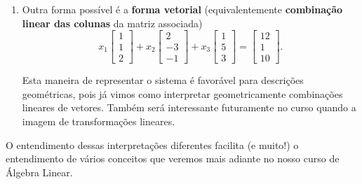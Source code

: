 \documentclass[../livro.tex]{subfiles}  %
\begin{document}
\begin{example}
\begin{enumerate}[$(i)$]
\item Outra forma possível é a \textbf{forma vetorial} (equivalentemente \textbf{combinação linear das colunas} da matriz associada)
\[
x_1
\left[
\begin{array}{c}
1   \\
1  \\
2 
\end{array}
\right] + x_2 
\left[
\begin{array}{c}
  2   \\
 -3   \\
 -1
\end{array}
\right] + x_3 
\left[
\begin{array}{c}
 1  \\
 5  \\
 3
\end{array}
\right] = 
\left[
\begin{array}{c}
12   \\
1  \\
10
\end{array}
\right].
\] 

Esta maneira de representar o sistema é favorável para descrições geométricas, pois já vimos como interpretar geometricamente combinações lineares de vetores. Também será interessante futuramente no curso quando a imagem de transformações lineares.
\end{enumerate}  O entendimento dessas interpretações diferentes facilita (e muito!) o entendimento de vários conceitos que veremos mais adiante no nosso curso de Álgebra Linear.
\end{example}
\end{document}
